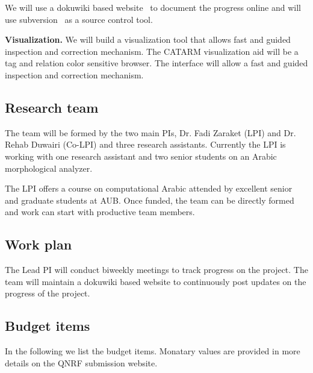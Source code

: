 \documentclass[12pt]{article}
\begin{document}
We will use a dokuwiki based website~\cite{Dok09} 
to document the progress online and will use 
subversion~\cite{Sub09} as a source control tool.
 
{\bf Visualization.} 
We will build a visualization tool that allows fast 
and guided inspection and correction mechanism. 
The CATARM visualization aid will be a tag and relation color
sensitive browser.
The interface will allow a fast and guided inspection and 
correction mechanism.

\subsection{Research team}

The team will be formed by the two main PIs, Dr. Fadi Zaraket (LPI)
and Dr. Rehab Duwairi (Co-LPI) and three research assistants.
Currently the LPI is working with one research assistant 
and two senior students on an Arabic morphological analyzer. 

The LPI offers a course on computational Arabic attended
by excellent senior and graduate students at AUB. 
Once funded, the team can be directly formed and work can start
with productive team members. 

\subsection{Work plan}

The Lead PI will conduct biweekly meetings to track progress 
on the project.
The team will maintain a dokuwiki based website to continuously 
post updates on the progress of the project.

\subsection{Budget items}

In the following we list the budget items. 
Monatary values are provided in more details on the QNRF 
submission website. 
\end{document}
